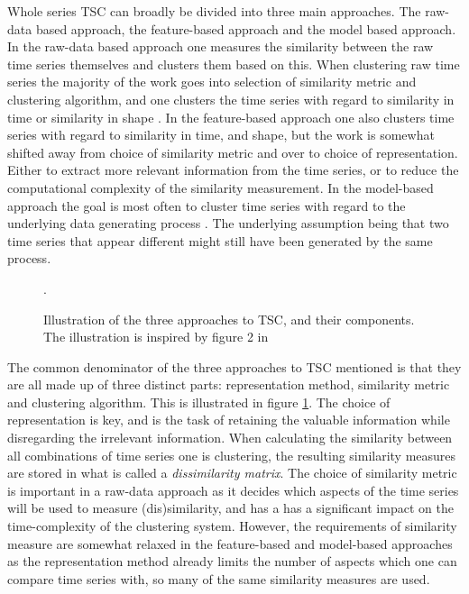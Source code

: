 Whole series TSC can broadly be divided into three main approaches. 
The raw-data based approach, the feature-based approach and the model based approach. 
In the raw-data based approach one measures the similarity between the raw time series themselves and clusters them based on this. 
When clustering raw time series the majority of the work goes into selection of similarity metric and clustering algorithm, and one clusters the time series with regard to similarity in time or similarity in shape \cite{tsc_rev}. 
In the feature-based approach one also clusters time series with regard to similarity in time, and shape, but the work is somewhat shifted away from choice of similarity metric and over to choice of representation. 
Either to extract more relevant information from the time series, or to reduce the computational complexity of the similarity measurement. 
In the model-based approach the goal is most often to cluster time series with regard to the underlying data generating process \cite{moar_mpl_tsc}.
The underlying assumption being that two time series that appear different might still have been generated by the same process.

\begin{figure}
    \begin{center}
    
    \end{center}
    \caption{Illustration of the three approaches to TSC, and their components. The illustration is inspired by figure 2 in \textcite{tsc_rev}}.
    \label{fig:tsc_approaches}
\end{figure}

The common denominator of the three approaches to TSC mentioned is that they are all made up of three distinct parts: representation method, similarity metric and clustering algorithm. 
This is illustrated in figure \ref{fig:tsc_approaches}.
The choice of representation is key, and is the task of retaining the valuable information while disregarding the irrelevant information. 
When calculating the similarity between all combinations of time series one is clustering, the resulting similarity measures are stored in what is called a \textit{dissimilarity matrix}.
The choice of similarity metric is important in a raw-data approach as it decides which aspects of the time series will be used to measure (dis)similarity, and has a has a significant impact on the time-complexity of the clustering system. 
However, the requirements of similarity measure are somewhat relaxed in the feature-based and model-based approaches as the representation method already limits the number of aspects which one can compare time series with, so many of the same similarity measures are used.

